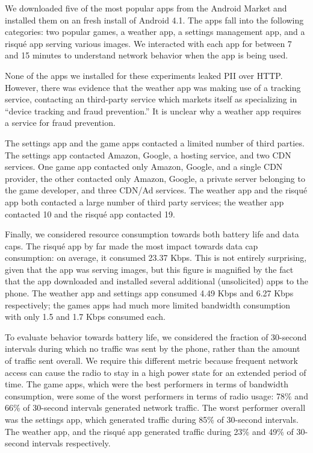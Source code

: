        We downloaded five of the most popular apps from the Android Market and installed them on an fresh install of Android 4.1.
       The apps fall into the following categories: two popular games, a weather app, a settings 
        management app, and a risqu\'{e} app serving various images. We interacted with each app for between 7 and 15 minutes 
        to understand network behavior when the app is being used.

    None of the apps we installed for these experiments leaked PII over HTTP. However, there was evidence that the weather app was making use of a tracking service, contacting an third-party service which markets itself as specializing in ``device tracking and fraud prevention.''
    It is unclear why a weather app requires a service for fraud prevention.

    The settings app and the game apps contacted a limited number of third parties.
    The settings app contacted Amazon, Google, a hosting service, and two CDN services.
    One game app contacted only Amazon, Google, and a single CDN provider, the other contacted only Amazon, Google, a private server belonging to the game developer, and three CDN/Ad services.
    The weather app and the risqu\'{e} app both contacted a large number of third party services; the weather app contacted 10 and the risqu\'{e} app contacted 19. 

   Finally, we considered resource consumption towards both battery life and data caps.
    The risqu\'{e} app by far made the most impact towards data cap consumption: on average, it consumed 23.37 Kbps.
    This is not entirely surprising, given that the app was serving images, but this figure is magnified by the fact that the app downloaded and installed several additional (unsolicited) apps to the phone.
    The weather app and settings app consumed 4.49 Kbps and 6.27 Kbps respectively; the games apps had much more limited bandwidth consumption with only 1.5 and 1.7 Kbps consumed each.

    To evaluate behavior towards battery life, we considered the fraction of 30-second intervals during which no traffic was sent by the phone, rather than the amount of traffic sent overall. 
    We require this different metric because frequent network access can cause the radio to stay in a high power state for an extended period of time.
    The game apps, which were the best performers in terms of bandwidth consumption, were some of the worst performers in terms of radio usage: 78\% and 66\% of 30-second intervals generated network traffic.
    The worst performer overall was the settings app, which generated traffic during 85\% of 30-second intervals.
    The weather app, and the risqu\'{e} app generated traffic during 23\% and 49\% of 30-second intervals respectively.

